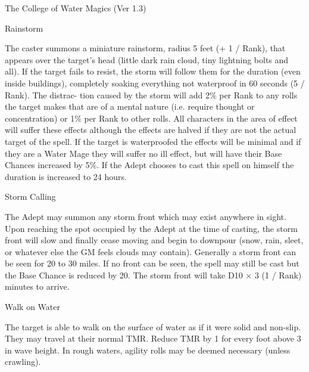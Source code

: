 \begin{Chapter}{The College of Water Magics (Ver 1.3)}
\begin{spell}[S-8]{Rainstorm}
\begin{effects}
The caster summons a miniature rainstorm, radius 5 feet (+ 1 / Rank),
that appears over the target’s head (little dark rain cloud, tiny
lightning bolts and all). If the target fails to resist, the storm
will follow them for the duration (even inside buildings), completely
soaking everything not waterproof in 60 seconds (5 / Rank).  The
distrac- tion caused by the storm will add 2\% per Rank to any rolls
the target makes that are of a mental nature (i.e. require thought or
concentration) or 1\% per Rank to other rolls. All characters in the
area of effect will suffer these effects although the effects are
halved if they are not the actual target of the spell.  If the target
is waterproofed the effects will be minimal and if they are a Water
Mage they will suffer no ill effect, but will have their Base Chances
increased by 5\%. If the Adept chooses to cast this spell on himself
the duration is increased to 24 hours.
\end{effects}
\end{spell}

\begin{spell}[S-9]{Storm Calling}

\begin{effects}
The Adept may summon any storm front which may exist anywhere in
sight. Upon reaching the spot occupied by the Adept at the time of
casting, the storm front will slow and finally cease moving and begin
to downpour (snow, rain, sleet, or whatever else the GM feels clouds
may contain).  Generally a storm front can be seen for 20 to 30
miles. If no front can be seen, the spell may still be cast but the
Base Chance is reduced by 20.  The storm front will take D10 × 3 (1 /
Rank) minutes to arrive.
\end{effects}
\end{spell}

\begin{spell}[S-10]{Walk on Water}
\begin{effects}
The target is able to walk on the surface of water as if it were solid
and non-slip.  They may travel at their normal TMR. Reduce TMR by 1
for every foot above 3 in wave height. In rough waters, agility rolls
may be deemed necessary (unless crawling).
\end{effects}
\end{spell}


\end{Chapter}
